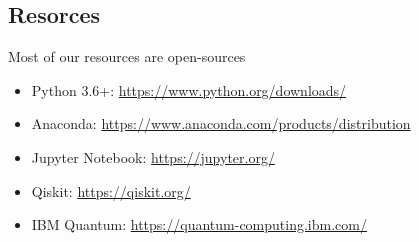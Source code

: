 \subsection{Resorces}
Most of our resources are open-sources
\begin{itemize}
    \item Python 3.6+: \url{https://www.python.org/downloads/}
    \item Anaconda: \url{https://www.anaconda.com/products/distribution}
    \item Jupyter Notebook: \url{https://jupyter.org/}
    \item Qiskit: \url{https://qiskit.org/}
    \item IBM Quantum: \url{https://quantum-computing.ibm.com/}
\end{itemize}